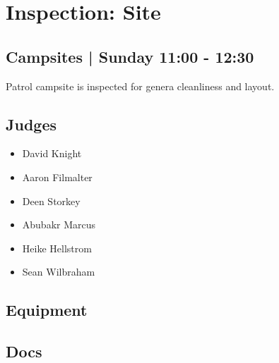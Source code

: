 \documentclass[10pt]{article}
\begin{document}
		\begin{minipage}{\linewidth}
		\setcounter{section}{39}
	\section{Inspection: Site }
	\subsection*{Campsites | Sunday 11:00 - 12:30}

	Patrol campsite is inspected for genera cleanliness and layout.

	\begin{multicols}{2}
	\subsection*{\faUsers \: Judges}
	\begin{itemize}
			\item David Knight
			\item Aaron Filmalter
			\item Deen Storkey
			\item Abubakr Marcus
			\item Heike Hellstrom
			\item Sean Wilbraham
		\end{itemize}
	\columnbreak
	\subsection*{\faWrench \: Equipment}
	        \vfill\null
        \subsection*{\faFile \: Docs}
     	\end{multicols}


	\vspace{1cm}
	\end{minipage}
\end{document}
